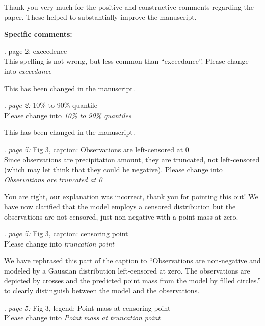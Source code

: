\documentclass[american,foldmarks=false,noconfig]{uibklttr}
\newenvironment{review}{\fontshape{\itdefault}\fontseries{\bfdefault} \selectfont \smallskip}{\par}
\begin{document}
Thank you very much for the positive and constructive 
comments regarding the paper. These helped to 
substantially improve the manuscript.

\bigskip

\textbf{Specific comments:}

\begin{review}
1. {\color{quotecolor} page 2: exceedence}\\
This spelling is not wrong, but less common than ``exceedance''.
Please change into \textit{exceedance}
\end{review}

This has been changed in the manuscript.

\begin{review}
2. {\color{quotecolor}\textit{page 2:} 10$\%$ to 90\% quantile}\\
Please change into \textit{10\% to 90\% quantiles}
\end{review}

This has been changed in the manuscript.

\begin{review}
3. {\color{quotecolor}\textit{page 5:} Fig 3, caption: Observations 
are left-censored at 0}\\
Since observations are precipitation amount, they are truncated, not 
left-censored (which may let think that they could be negative). 
Please change into \textit{Observations are truncated at 0}
\end{review}

You are right, our explanation was incorrect, thank you for pointing
this out! We have now clarified that the model employs a censored
distribution but the observations are not censored, just non-negative
with a point mass at zero.


\begin{review}
4. {\color{quotecolor}\textit{page 5:} Fig 3, caption: censoring point}\\
Please change into \textit{truncation point}
\end{review}

We have rephrased this part of the caption to ``Observations are non-negative 
and modeled by a Gaussian distribution left-censored at zero.
The observations are depicted by crosses and the predicted point mass
from the model by filled circles.'' to clearly distinguish between the model
and the observations.


\begin{review}
5. {\color{quotecolor}\textit{page 5:} Fig 3, legend: Point mass at 
censoring point}\\
Please change into \textit{Point mass at truncation point}
\end{review}
\end{document}
